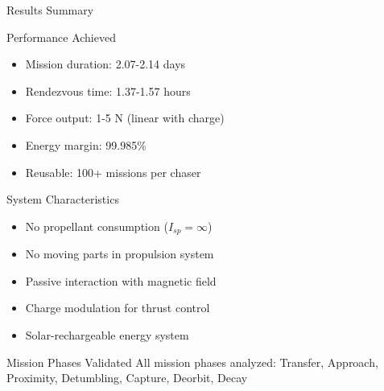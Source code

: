 \documentclass[aspectratio=169]{beamer}
\begin{document}
\begin{frame}{Results Summary}
\begin{block}{Performance Achieved}
\begin{itemize}
    \item Mission duration: 2.07-2.14 days
    \item Rendezvous time: 1.37-1.57 hours
    \item Force output: 1-5 N (linear with charge)
    \item Energy margin: 99.985\%
    \item Reusable: 100+ missions per chaser
\end{itemize}
\end{block}

\begin{block}{System Characteristics}
\begin{itemize}
    \item No propellant consumption ($I_{sp} = \infty$)
    \item No moving parts in propulsion system
    \item Passive interaction with magnetic field
    \item Charge modulation for thrust control
    \item Solar-rechargeable energy system
\end{itemize}
\end{block}

\begin{block}{Mission Phases Validated}
All mission phases analyzed: Transfer, Approach, Proximity, Detumbling, Capture, Deorbit, Decay
\end{block}
\end{frame}
\end{document}
